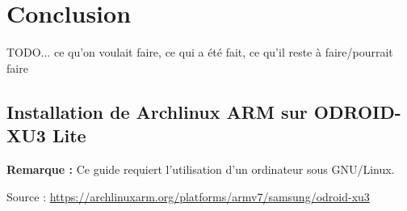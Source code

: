\documentclass[11pt,a4paper,oneside]{report}
\newcommand{\odroid}{ODROID-XU3 Lite }
\begin{document}
\chapter{Conclusion}
TODO... ce qu'on voulait faire, ce qui a été fait, ce qu'il reste à faire/pourrait faire


\nocite{*} %



\begin{appendices}
\chapter{Installation de Archlinux ARM sur \odroid}\label{install_alarm_odroid}

\textbf{Remarque : }Ce guide requiert l'utilisation d'un ordinateur sous GNU/Linux.

Source : \url{https://archlinuxarm.org/platforms/armv7/samsung/odroid-xu3}



\end{appendices}
\end{document}
